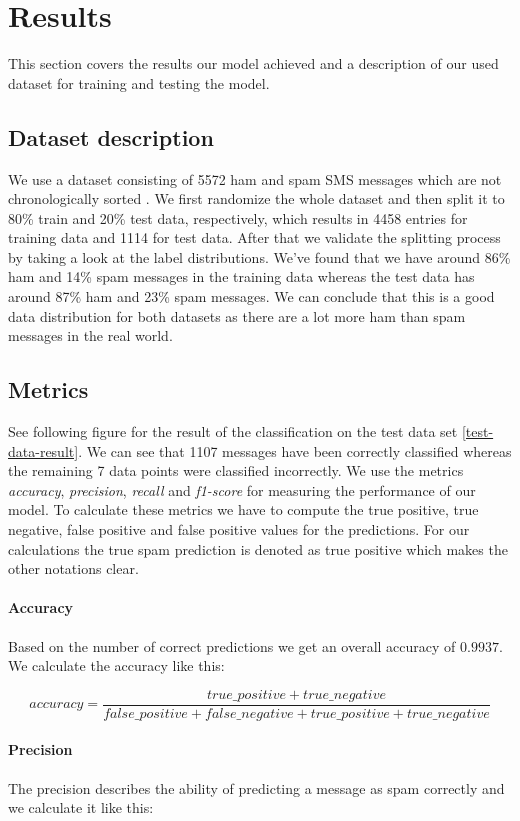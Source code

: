 \section{Results}
This section covers the results our model achieved and a description of our used dataset for training and testing the model.

\subsection{Dataset description}
We use a dataset consisting of 5572 ham and spam SMS messages which are not chronologically sorted \cite{dataset}. We first randomize the whole dataset and then split it to 80\% train and 20\% test data, respectively, which results in 4458 entries for training data and 1114 for test data. After that we validate the splitting process by taking a look at the label distributions. We've found that we have around 86\% ham and 14\% spam messages in the training data whereas the test data has around 87\% ham and 23\% spam messages. We can conclude that this is a good data distribution for both datasets as there are a lot more ham than spam messages in the real world.

\subsection{Metrics}
See following figure for the result of the classification on the test data set \ref{test-data-result}. We can see that 1107 messages have been correctly classified whereas the remaining 7 data points were classified incorrectly. We use the metrics \textit{accuracy}, \textit{precision}, \textit{recall} and \textit{f1-score} for measuring the performance of our model. To calculate these metrics we have to compute the true positive, true negative, false positive and false positive values for the predictions. For our calculations the true spam prediction is denoted as true positive which makes the other notations clear.

\paragraph{Accuracy}
Based on the number of correct predictions we get an overall accuracy of $0.9937$. We calculate the accuracy like this:

$$accuracy = \frac{true\_positive + true\_negative}{false\_positive + false\_negative + true\_positive + true\_negative}$$

\paragraph{Precision}
The precision describes the ability of predicting a message as spam correctly and we calculate it like this:

